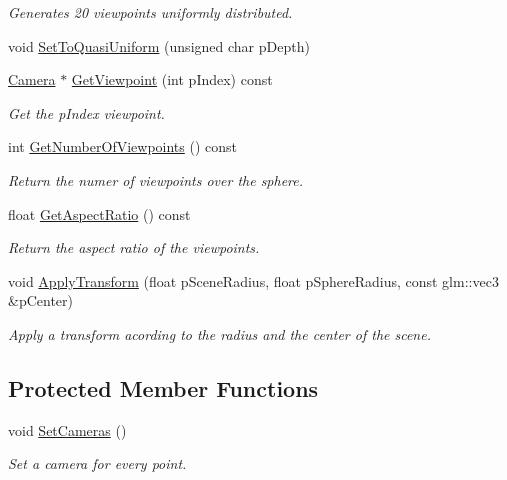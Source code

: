 \begin{DoxyCompactItemize}
\begin{DoxyCompactList}\small\item\em Generates 20 viewpoints uniformly distributed. \end{DoxyCompactList}\item 
void \hyperlink{class_sphere_of_viewpoints_a1e8a20c0563d81f9c4967c197304ba71}{Set\+To\+Quasi\+Uniform} (unsigned char p\+Depth)
\item 
\hyperlink{class_camera}{Camera} $\ast$ \hyperlink{class_sphere_of_viewpoints_a92c90b14ca81d1515d1d5af098d99d74}{Get\+Viewpoint} (int p\+Index) const 
\begin{DoxyCompactList}\small\item\em Get the p\+Index viewpoint. \end{DoxyCompactList}\item 
int \hyperlink{class_sphere_of_viewpoints_a9a753963ecf71a6168f4a75e81ce63f8}{Get\+Number\+Of\+Viewpoints} () const 
\begin{DoxyCompactList}\small\item\em Return the numer of viewpoints over the sphere. \end{DoxyCompactList}\item 
float \hyperlink{class_sphere_of_viewpoints_a85872899ddc31206f7e6011b4a3b3957}{Get\+Aspect\+Ratio} () const 
\begin{DoxyCompactList}\small\item\em Return the aspect ratio of the viewpoints. \end{DoxyCompactList}\item 
void \hyperlink{class_sphere_of_viewpoints_a6a278cb96954c6ae0f7eba9525e43897}{Apply\+Transform} (float p\+Scene\+Radius, float p\+Sphere\+Radius, const glm\+::vec3 \&p\+Center)
\begin{DoxyCompactList}\small\item\em Apply a transform acording to the radius and the center of the scene. \end{DoxyCompactList}\end{DoxyCompactItemize}
\subsection*{Protected Member Functions}
\begin{DoxyCompactItemize}
\item 
void \hyperlink{class_sphere_of_viewpoints_a3c0cc59d511c0bf9e97fd7e10b0a9983}{Set\+Cameras} ()
\begin{DoxyCompactList}\small\item\em Set a camera for every point. \end{DoxyCompactList}\end{DoxyCompactItemize}
